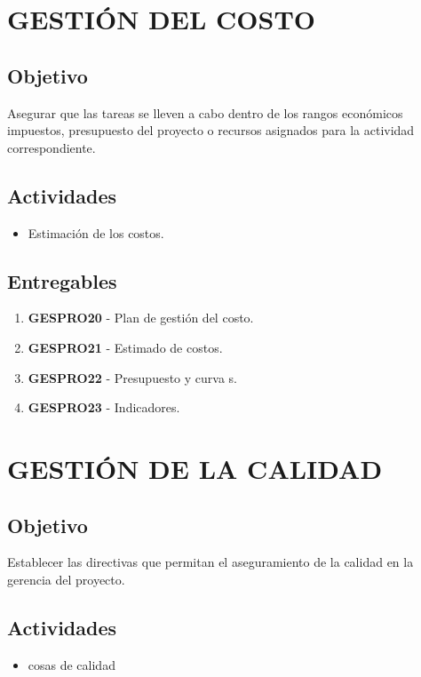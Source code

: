 \chapter{GESTI\'ON DEL COSTO}

\section{Objetivo}
Asegurar que las tareas se lleven a cabo dentro de los rangos econ\'omicos impuestos, presupuesto del
proyecto o recursos asignados para la actividad correspondiente.%
%
\section{Actividades}
\begin{itemize}
	\item Estimaci\'on de los costos.
\end{itemize}
%
\section{Entregables}

\begin{enumerate}
	\item \textbf{GESPRO20} - Plan de gesti\'on del costo.
	\item \textbf{GESPRO21} - Estimado de costos.
	\item \textbf{GESPRO22} - Presupuesto y curva s.
	\item \textbf{GESPRO23} - Indicadores.
\end{enumerate}

\chapter{GESTI\'ON DE LA CALIDAD}

\section{Objetivo}
Establecer las directivas que permitan el aseguramiento de la calidad en la gerencia
del proyecto.%
%
\section{Actividades}
\begin{itemize}
	\item cosas de calidad
\end{itemize}
%

